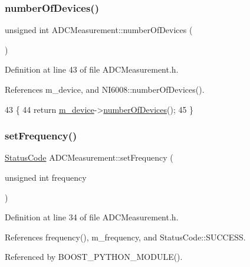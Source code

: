 \subsubsection{\texorpdfstring{number\+Of\+Devices()}{numberOfDevices()}}
{\footnotesize\ttfamily unsigned int A\+D\+C\+Measurement\+::number\+Of\+Devices (\begin{DoxyParamCaption}{ }\end{DoxyParamCaption})\hspace{0.3cm}{\ttfamily [inline]}}



Definition at line 43 of file A\+D\+C\+Measurement.\+h.



References m\+\_\+device, and N\+I6008\+::number\+Of\+Devices().


\begin{DoxyCode}
43                                 \{
44     \textcolor{keywordflow}{return} \hyperlink{classADCMeasurement_afc825cc28b05894a0f762452459988e1}{m\_device}->\hyperlink{classNI6008_a293fbf44b101e82a57404d1c76f07a87}{numberOfDevices}();
45   \}
\end{DoxyCode}
\mbox{\label{classADCMeasurement_a08433e5168f45de1061bf9a17f022f68}} 
\subsubsection{\texorpdfstring{set\+Frequency()}{setFrequency()}}
{\footnotesize\ttfamily \hyperlink{classStatusCode}{Status\+Code} A\+D\+C\+Measurement\+::set\+Frequency (\begin{DoxyParamCaption}\item[{unsigned int}]{frequency }\end{DoxyParamCaption})\hspace{0.3cm}{\ttfamily [inline]}}



Definition at line 34 of file A\+D\+C\+Measurement.\+h.



References frequency(), m\+\_\+frequency, and Status\+Code\+::\+S\+U\+C\+C\+E\+SS.



Referenced by B\+O\+O\+S\+T\+\_\+\+P\+Y\+T\+H\+O\+N\+\_\+\+M\+O\+D\+U\+L\+E().


